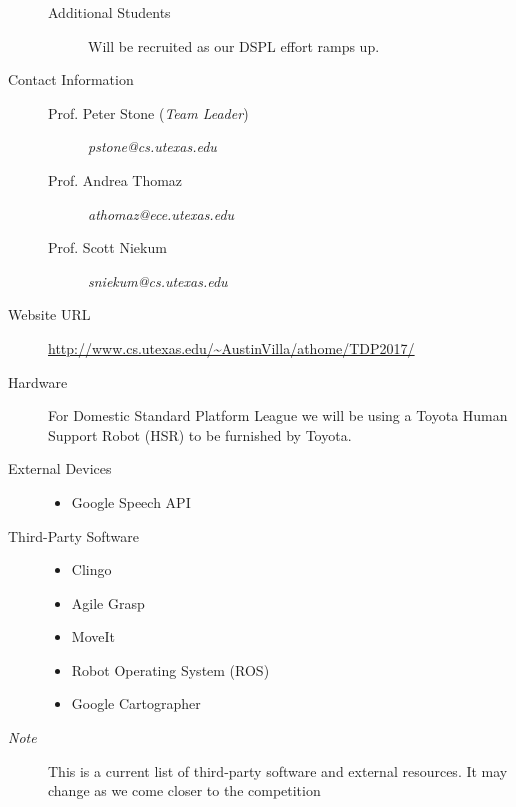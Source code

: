 \begin{description}
\begin{description}
\item[Additional Students] Will be recruited as our DSPL effort ramps up.
\end{description}
\item[Contact Information]\hfill
\begin{description}
\item[Prof. Peter Stone (\textit{Team Leader})] \textit{pstone@cs.utexas.edu }
\item[Prof. Andrea Thomaz] \textit{athomaz@ece.utexas.edu}
\item[Prof. Scott Niekum] \textit{sniekum@cs.utexas.edu }
\end{description}
\item[Website URL]\url{http://www.cs.utexas.edu/~AustinVilla/athome/TDP2017/}
\item[Hardware] For Domestic Standard Platform League we will be using a Toyota Human Support Robot (HSR) to be furnished by Toyota.
\item[External Devices] \hfill 
\begin{itemize}
\item Google Speech API
\end{itemize}
\item[Third-Party Software] \hfill
\begin{itemize}
\item Clingo
\item Agile Grasp
\item MoveIt
\item Robot Operating System (ROS)
\item Google Cartographer
\end{itemize}
\item[\textit{Note}] This is a current list of third-party software and external resources. It may change as we come closer to the competition

\end{description}
